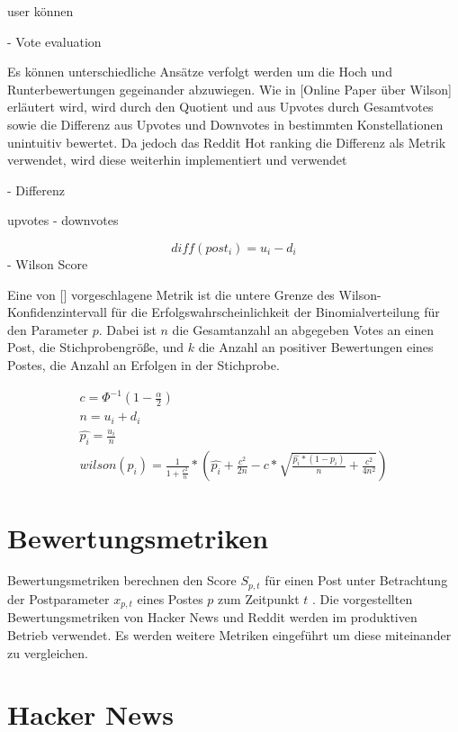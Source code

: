user können 


-  Vote evaluation

	Es können unterschiedliche Ansätze verfolgt werden um die Hoch und Runterbewertungen gegeinander abzuwiegen. 
	Wie in [Online Paper über Wilson] erläutert wird, wird durch den Quotient und aus Upvotes durch Gesamtvotes sowie die Differenz aus Upvotes und Downvotes in bestimmten Konstellationen unintuitiv bewertet. Da jedoch das Reddit Hot ranking die Differenz als Metrik verwendet, wird diese weiterhin implementiert und verwendet
	
- Differenz
	
	upvotes - downvotes
	
\begin{equation}
diff(post_{i}) = u_{i} - d_{i}
\end{equation}
- Wilson Score

	Eine von [] vorgeschlagene Metrik ist die untere Grenze des Wilson-Konfidenzintervall für die Erfolgswahrscheinlichkeit der Binomialverteilung für den Parameter $p$. Dabei ist $n$ die Gesamtanzahl an abgegeben Votes an einen Post, die Stichprobengröße, und $k$ die Anzahl an positiver Bewertungen eines Postes, die Anzahl an Erfolgen in der Stichprobe.
	
\begin{align}
 c = \Phi^{-1}(1 - \frac{\alpha}{2}) \\
 n = u_{i} + d_{i} \\
 \hat{p_{i}} = \frac{u_{i}}{n}  \\
 wilson(p_{i}) = \frac{1}{1+\frac{c^2}{n}}*(\hat{p_{i}} + \frac{c^2}{2n} - c* \sqrt{\frac{\hat{p_{i}}*(1 - \hat{p_{i}})}{n} + \frac{c^2}{4n^2}})
\end{align}
	
	

\section{Bewertungsmetriken}

Bewertungsmetriken berechnen den Score $S_{p,t}$ für einen Post unter Betrachtung der Postparameter $x_{p,t}$ eines Postes $p$ zum Zeitpunkt $t$ . Die vorgestellten Bewertungsmetriken von Hacker News und Reddit werden im produktiven Betrieb verwendet. Es werden weitere Metriken eingeführt um diese miteinander zu vergleichen. 
	
\section{Hacker News}
\label{seqHackerNews}

